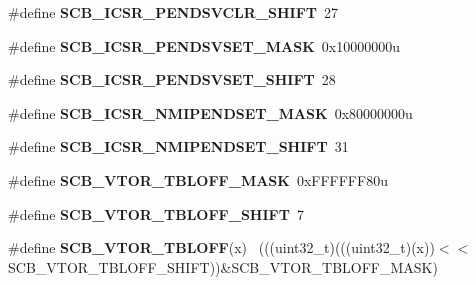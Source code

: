 \begin{DoxyCompactItemize}
\item 
\hypertarget{group___s_c_b___register___masks_gad7a5894ad98606b443ab6f1b52f2bc36}{}\#define {\bfseries S\+C\+B\+\_\+\+I\+C\+S\+R\+\_\+\+P\+E\+N\+D\+S\+V\+C\+L\+R\+\_\+\+S\+H\+I\+F\+T}~27\label{group___s_c_b___register___masks_gad7a5894ad98606b443ab6f1b52f2bc36}

\item 
\hypertarget{group___s_c_b___register___masks_ga5ed59a5d03a7d25ef76aa9d92e25e4a5}{}\#define {\bfseries S\+C\+B\+\_\+\+I\+C\+S\+R\+\_\+\+P\+E\+N\+D\+S\+V\+S\+E\+T\+\_\+\+M\+A\+S\+K}~0x10000000u\label{group___s_c_b___register___masks_ga5ed59a5d03a7d25ef76aa9d92e25e4a5}

\item 
\hypertarget{group___s_c_b___register___masks_ga76cddcbf872958b00237c662309251d2}{}\#define {\bfseries S\+C\+B\+\_\+\+I\+C\+S\+R\+\_\+\+P\+E\+N\+D\+S\+V\+S\+E\+T\+\_\+\+S\+H\+I\+F\+T}~28\label{group___s_c_b___register___masks_ga76cddcbf872958b00237c662309251d2}

\item 
\hypertarget{group___s_c_b___register___masks_gab2a6cb5708895a81ec8826b8fa546145}{}\#define {\bfseries S\+C\+B\+\_\+\+I\+C\+S\+R\+\_\+\+N\+M\+I\+P\+E\+N\+D\+S\+E\+T\+\_\+\+M\+A\+S\+K}~0x80000000u\label{group___s_c_b___register___masks_gab2a6cb5708895a81ec8826b8fa546145}

\item 
\hypertarget{group___s_c_b___register___masks_ga8a185fc794df7e755e5f3a8b3a06d042}{}\#define {\bfseries S\+C\+B\+\_\+\+I\+C\+S\+R\+\_\+\+N\+M\+I\+P\+E\+N\+D\+S\+E\+T\+\_\+\+S\+H\+I\+F\+T}~31\label{group___s_c_b___register___masks_ga8a185fc794df7e755e5f3a8b3a06d042}

\item 
\hypertarget{group___s_c_b___register___masks_ga07fd57e90baff628af14394c8142dc27}{}\#define {\bfseries S\+C\+B\+\_\+\+V\+T\+O\+R\+\_\+\+T\+B\+L\+O\+F\+F\+\_\+\+M\+A\+S\+K}~0x\+F\+F\+F\+F\+F\+F80u\label{group___s_c_b___register___masks_ga07fd57e90baff628af14394c8142dc27}

\item 
\hypertarget{group___s_c_b___register___masks_gac6092f3c78a9f126c2d02740a7976708}{}\#define {\bfseries S\+C\+B\+\_\+\+V\+T\+O\+R\+\_\+\+T\+B\+L\+O\+F\+F\+\_\+\+S\+H\+I\+F\+T}~7\label{group___s_c_b___register___masks_gac6092f3c78a9f126c2d02740a7976708}

\item 
\hypertarget{group___s_c_b___register___masks_ga0fc8974ae1755bc9819c97712403b828}{}\#define {\bfseries S\+C\+B\+\_\+\+V\+T\+O\+R\+\_\+\+T\+B\+L\+O\+F\+F}(x)                                          ~(((uint32\+\_\+t)(((uint32\+\_\+t)(x))$<$$<$S\+C\+B\+\_\+\+V\+T\+O\+R\+\_\+\+T\+B\+L\+O\+F\+F\+\_\+\+S\+H\+I\+F\+T))\&S\+C\+B\+\_\+\+V\+T\+O\+R\+\_\+\+T\+B\+L\+O\+F\+F\+\_\+\+M\+A\+S\+K)\label{group___s_c_b___register___masks_ga0fc8974ae1755bc9819c97712403b828}


\end{DoxyCompactItemize}
